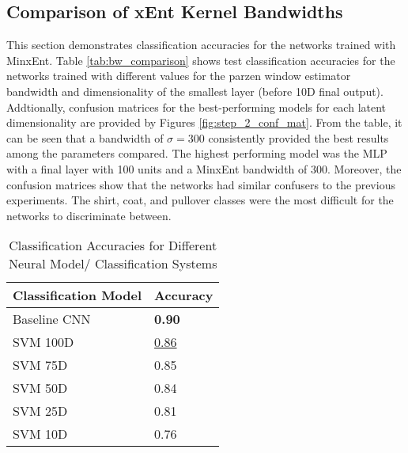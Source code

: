 \documentclass[conference]{IEEEtran}
\begin{document}
 
\subsection{Comparison of xEnt Kernel Bandwidths} \label{bw_comparison}
This section demonstrates classification accuracies for the networks trained with MinxEnt.  Table \ref{tab:bw_comparison} shows test classification accuracies for the networks trained with different values for the parzen window estimator bandwidth and dimensionality of the smallest layer (before 10D final output).  Addtionally, confusion matrices for the best-performing models for each latent dimensionality are provided by Figures \ref{fig:step_2_conf_mat}. From the table, it can be seen that a bandwidth of $\sigma=300$ consistently provided the best results among the parameters compared. The highest performing model was the MLP with a final layer with  100 units and a MinxEnt bandwidth of 300.  Moreover, the confusion matrices show that the networks had similar confusers to the previous experiments.  The shirt, coat, and pullover classes were the most difficult for the networks to discriminate between.

 \begin{table}[h]
	\caption{Classification Accuracies for Different Neural Model/ Classification Systems}
	\label{tab:step1comparison}
	\normalsize
	\begin{tabularx}{\columnwidth}{ |X|X| } 
		\hline
		\centering \textbf{Classification Model}  & \textbf{Accuracy} \\
		\hline
		\centering Baseline CNN & \textbf{0.90} \\
		\hline
		\centering SVM 100D & \underline{0.86} \\
		\hline
		\centering SVM 75D & 0.85 \\
		\hline
		\centering SVM 50D & 0.84 \\
		\hline
		\centering SVM 25D & 0.81 \\
		\hline
		\centering SVM 10D & 0.76 \\
		\hline
	\end{tabularx}
\end{table} 
\end{document}
